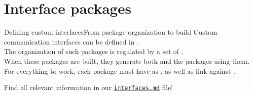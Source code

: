 
\section{Interface packages}

\begin{frame}{Defining custom interfaces}{From package organization to build}
  Custom communication interfaces can be defined in .\\
  \bigskip
  The organization of such packages is regulated by a set of .\\
  \bigskip
  When these packages are built, they generate both  and  the packages using them.\\
  \bigskip
  For everything to work, each package must have  as , as well as link against .\\
  \bigskip
  \begin{block}{}
    \centering
    Find all relevant information in our \href{https://github.com/IntelligentSystemsLabUTV/ros2-examples/blob/humble/interfaces.md}{\color{blue}\underline{\texttt{interfaces.md}}} file!
  \end{block}
\end{frame}
